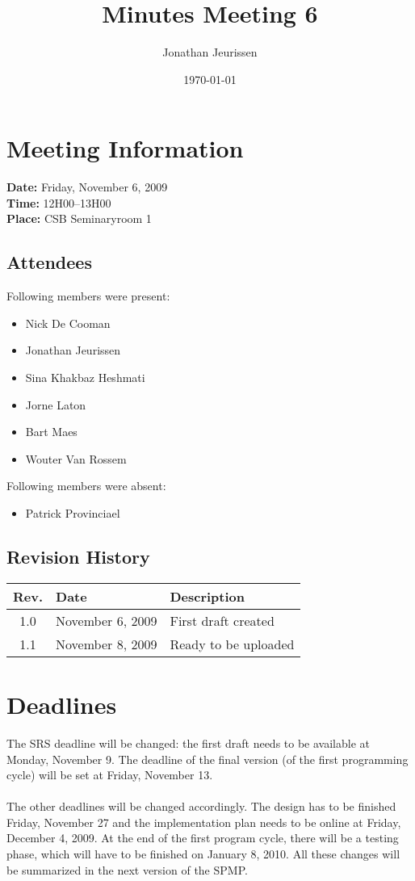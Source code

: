 \documentclass[a4paper, 12pt]{article}
\begin{document}
\title{Minutes Meeting 6}
\author{Jonathan Jeurissen}
\date{\today}

\maketitle	
	\section{Meeting Information}
		\textbf{Date:} Friday, November 6, 2009\\
		\textbf{Time:} 12H00--13H00\\
		\textbf{Place:} CSB Seminaryroom 1\\
		\subsection{Attendees}
Following members were present:
			\begin{itemize}
				\item Nick De Cooman
				\item Jonathan Jeurissen
				\item Sina Khakbaz Heshmati
				\item Jorne Laton
				\item Bart Maes
				\item Wouter Van Rossem
			\end{itemize}
Following members were absent:
			\begin{itemize}
				\item Patrick Provinciael
			\end{itemize}
			
		\subsection{Revision History}
			\begin{tabular}{c | l | l }
				\textbf{Rev.} & \textbf{Date} & \textbf{Description} \\
				\hline
				1.0 & November 6, 2009 & First draft created \\
				1.1 & November 8, 2009 & Ready to be uploaded \\
			\end{tabular}		

	\section{Deadlines}
The SRS deadline will be changed: the first draft needs to be available at Monday, November 9. The deadline of the final version (of the first programming cycle) will be set at Friday, November 13.\\ \\ 
The other deadlines will be changed accordingly.
The design has to be finished Friday, November 27 and the implementation plan needs to be online at Friday, December 4, 2009. At the end of the first program cycle, there will be a testing phase, which will have to be finished on January 8, 2010. All these changes will be summarized in the next version of the SPMP.\\
\end{document}
